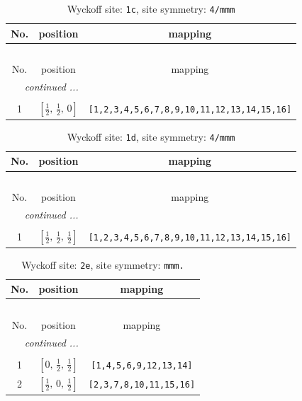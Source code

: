 \documentclass[fleqn,8pt]{jsarticle}
\begin{document}
\begin{longtable}{ccc}
\caption{Wyckoff site: {\tt 1c}, site symmetry: {\tt 4/mmm}}
 \\
 \hline \hline
No. & position & mapping \\ \hline \endfirsthead

\multicolumn{2}{l}{\tablename\ \thetable{}} \\
 \hline \hline
No. & position & mapping \\ \hline \endhead

 \hline \hline
\multicolumn{2}{r}{\footnotesize\it continued ...} \\ \endfoot

 \hline \hline
\multicolumn{2}{r}{} \\ \endlastfoot

1 & $\left[ \frac{1}{2},\, \frac{1}{2},\, 0 \right]$ & {\tt [1,2,3,4,5,6,7,8,9,10,11,12,13,14,15,16]} \\
\end{longtable}
\renewcommand{\arraystretch}{1.2}
\begin{longtable}{ccc}
\caption{Wyckoff site: {\tt 1d}, site symmetry: {\tt 4/mmm}}
 \\
 \hline \hline
No. & position & mapping \\ \hline \endfirsthead

\multicolumn{2}{l}{\tablename\ \thetable{}} \\
 \hline \hline
No. & position & mapping \\ \hline \endhead

 \hline \hline
\multicolumn{2}{r}{\footnotesize\it continued ...} \\ \endfoot

 \hline \hline
\multicolumn{2}{r}{} \\ \endlastfoot

1 & $\left[ \frac{1}{2},\, \frac{1}{2},\, \frac{1}{2} \right]$ & {\tt [1,2,3,4,5,6,7,8,9,10,11,12,13,14,15,16]} \\
\end{longtable}
\renewcommand{\arraystretch}{1.2}
\begin{longtable}{ccc}
\caption{Wyckoff site: {\tt 2e}, site symmetry: {\tt mmm.}}
 \\
 \hline \hline
No. & position & mapping \\ \hline \endfirsthead

\multicolumn{2}{l}{\tablename\ \thetable{}} \\
 \hline \hline
No. & position & mapping \\ \hline \endhead

 \hline \hline
\multicolumn{2}{r}{\footnotesize\it continued ...} \\ \endfoot

 \hline \hline
\multicolumn{2}{r}{} \\ \endlastfoot

1 & $\left[ 0,\, \frac{1}{2},\, \frac{1}{2} \right]$ & {\tt [1,4,5,6,9,12,13,14]} \\ \hline
2 & $\left[ \frac{1}{2},\, 0,\, \frac{1}{2} \right]$ & {\tt [2,3,7,8,10,11,15,16]} \\
\end{longtable}
\end{document}
